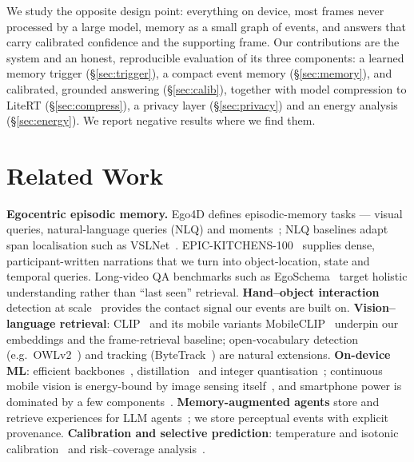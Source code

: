 \documentclass[10pt,twocolumn]{article}
\begin{document}
We study the opposite design point: everything on device, most frames never processed by a large model, memory as a
small graph of events, and answers that carry calibrated confidence and the supporting frame. Our contributions are
the system and an honest, reproducible evaluation of its three components: a learned memory trigger
(\S\ref{sec:trigger}), a compact event memory (\S\ref{sec:memory}), and calibrated, grounded answering
(\S\ref{sec:calib}), together with model compression to LiteRT (\S\ref{sec:compress}), a privacy layer
(\S\ref{sec:privacy}) and an energy analysis (\S\ref{sec:energy}). We report negative results where we find them.

\section{Related Work}
\textbf{Egocentric episodic memory.} Ego4D defines episodic-memory tasks --- visual queries, natural-language queries
(NLQ) and moments~\citep{grauman2022ego4d}; NLQ baselines adapt span localisation such as VSLNet~\citep{zhang2020vslnet}.
EPIC-KITCHENS-100~\citep{damen2022rescaling} supplies dense, participant-written narrations that we turn into
object-location, state and temporal queries. Long-video QA benchmarks such as EgoSchema~\citep{mangalam2023egoschema}
target holistic understanding rather than ``last seen'' retrieval.
\textbf{Hand--object interaction} detection at scale~\citep{shan2020understanding} provides the contact signal our events
are built on. \textbf{Vision--language retrieval}: CLIP~\citep{radford2021clip} and its mobile variants
MobileCLIP~\citep{vasu2024mobileclip} underpin our embeddings and the frame-retrieval baseline; open-vocabulary detection
(e.g.\ OWLv2~\citep{minderer2023owlv2}) and tracking (ByteTrack~\citep{zhang2022bytetrack}) are natural extensions.
\textbf{On-device ML}: efficient backbones~\citep{howard2019mobilenetv3}, distillation~\citep{hinton2015distilling} and
integer quantisation~\citep{jacob2018quantization}; continuous mobile vision is energy-bound by image sensing
itself~\citep{likamwa2013energy}, and smartphone power is dominated by a few components~\citep{carroll2010power}.
\textbf{Memory-augmented agents} store and retrieve experiences for LLM agents~\citep{park2023generative,packer2023memgpt};
we store perceptual events with explicit provenance. \textbf{Calibration and selective prediction}: temperature and
isotonic calibration~\citep{guo2017calibration,zadrozny2002isotonic} and risk--coverage analysis~\citep{geifman2017selective}.
\end{document}
